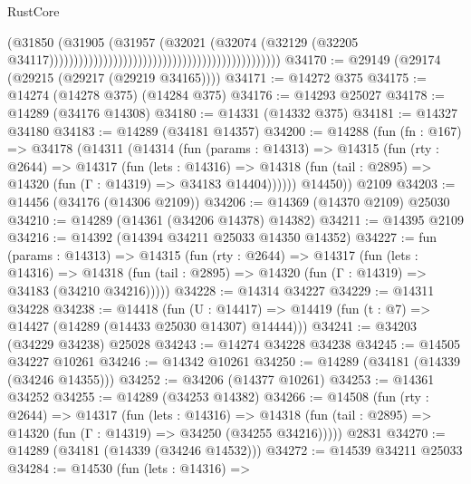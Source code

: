 \begin{lexlean}{RustCore}
\begin{coremodule}
                                                                                    (@31850
                                                                                      (@31905
                                                                                        (@31957
                                                                                          (@32021
                                                                                            (@32074
                                                                                              (@32129
                                                                                                (@32205
                                                                                                  @34117)))))))))))))))))))))))))))))))))))))))))))))))
@34170 := @29149 (@29174 (@29215 (@29217 (@29219 @34165))))
@34171 := @14272 @375
@34175 := @14274 (@14278 @375) (@14284 @375)
@34176 := @14293 @25027
@34178 := @14289 (@34176 @14308)
@34180 := @14331 (@14332 @375)
@34181 := @14327 @34180
@34183 := @14289 (@34181 @14357)
@34200 := @14288
    (fun (fn : @167) =>
    @34178
      (@14311
        (@14314
          (fun (params : @14313) =>
          @14315
            (fun (rty : @2644) =>
            @14317
              (fun (lets : @14316) =>
              @14318 (fun (tail : @2895) => @14320 (fun (Γ : @14319) => @34183 @14404))))))
        @14450))
    @2109
@34203 := @14456 (@34176 (@14306 @2109))
@34206 := @14369 (@14370 @2109) @25030
@34210 := @14289 (@14361 (@34206 @14378) @14382)
@34211 := @14395 @2109
@34216 := @14392 (@14394 @34211 @25033 @14350 @14352)
@34227 := fun (params : @14313) =>
  @14315
    (fun (rty : @2644) =>
    @14317
      (fun (lets : @14316) =>
      @14318 (fun (tail : @2895) => @14320 (fun (Γ : @14319) => @34183 (@34210 @34216)))))
@34228 := @14314 @34227
@34229 := @14311 @34228
@34238 := @14418
    (fun (U : @14417) => @14419 (fun (t : @7) => @14427 (@14289 (@14433 @25030 @14307) @14444)))
@34241 := @34203 (@34229 @34238) @25028
@34243 := @14274 @34228 @34238
@34245 := @14505 @34227 @10261
@34246 := @14342 @10261
@34250 := @14289 (@34181 (@14339 (@34246 @14355)))
@34252 := @34206 (@14377 @10261)
@34253 := @14361 @34252
@34255 := @14289 (@34253 @14382)
@34266 := @14508
    (fun (rty : @2644) =>
    @14317
      (fun (lets : @14316) =>
      @14318 (fun (tail : @2895) => @14320 (fun (Γ : @14319) => @34250 (@34255 @34216)))))
    @2831
@34270 := @14289 (@34181 (@14339 (@34246 @14532)))
@34272 := @14539 @34211 @25033
@34284 := @14530
    (fun (lets : @14316) =>

\end{coremodule}
\end{lexlean}
